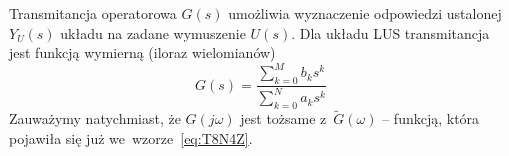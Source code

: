 \documentclass[paper=a4,DIV=12]{lpas}
\begin{document}
Transmitancja operatorowa $G\left(s\right)$ umożliwia wyznaczenie odpowiedzi
ustalonej $Y_U(s)$ układu na zadane wymuszenie $U(s)$. Dla układu LUS
transmitancja jest funkcją wymierną (iloraz wielomianów)
\begin{equation}
  G\left(s\right) = \frac{
    \sum_{k = 0}^{M}{b_k s^k}
  }{
    \sum_{k = 0}^{N}{a_k s^k}
  }
  \label{eq:X3KG0}
\end{equation}
Zauważymy natychmiast, że $G(j\omega)$ jest tożsame z~$\tilde{G}(\omega)$ --
funkcją, która pojawiła się już we~wzorze~\eqref{eq:T8N4Z}.

\end{document}
